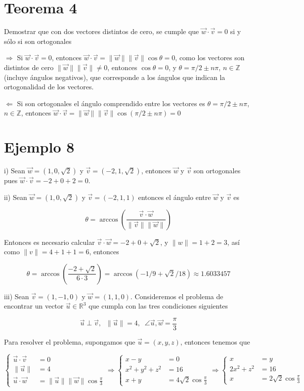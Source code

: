 \documentclass{article}
\begin{document}
\section*{Teorema 4}
Demostrar que con dos vectores distintos de cero, se cumple que $\vec{w} \cdot \vec{v} = 0$ si y sólo si son ortogonales

$\Rightarrow$ Si $\vec{w} \cdot \vec{v} = 0$, entonces $\vec{w} \cdot \vec{v} = \| \vec{w} \| \| \vec{v} \| \cos{\theta} = 0$, como los vectores son distintos de cero $\| \vec{w} \| \| \vec{v} \| \neq 0$, entonces $\cos{\theta}=0$, y $\theta=\pi/2 \pm n\pi$, $n\in\mathbb{Z}$ (incluye ángulos negativos), que corresponde a los ángulos que indican la ortogonalidad de los vectores.

$\Leftarrow$ Si son ortogonales el ángulo comprendido entre los vectores es $\theta=\pi/2\pm n\pi$, $n\in\mathbb{Z}$, entonces $\vec{w} \cdot \vec{v} = \| \vec{w} \| \| \vec{v} \| \cos{(\pi/2\pm n\pi)} =0 $

\section*{Ejemplo 8}
\noindent i) Sean $\vec{w} = (1,0,\sqrt{2})$ y $\vec{v} = (-2,1,\sqrt{2})$, entonces $\vec{w}$ y $\vec{v}$ son ortogonales pues $\vec{w}\cdot \vec{v}= -2+0+2=0$.

ii) Sean $\vec{w} = (1,0,\sqrt{2})$ y $\vec{v} = (-2,1,1)$ entonces el ángulo entre $\vec{w}$ y  $\vec{v}$ es 

$$
\theta = \arccos{\left(\frac{\vec{v}\cdot\vec{w}}{\| \vec{v} \| \| \vec{w} \|} \right)}
$$

Entonces es necesario calcular $\vec{v}\cdot\vec{w} = -2 +0 + \sqrt{2}$, y $\|w\|=1+2 = 3$, así como $\|v\|=4+1+1 = 6$, entonces

$$
\theta = \arccos{\left(\frac{-2 + \sqrt{2}}{6 \cdot 3} \right)} = \arccos{(-1/9+\sqrt{2}/18)} \approx 1.6033457
$$

iii) Sean $\vec{v} = (1,-1,0)$ y $\vec{w} = (1,1,0)$. Consideremos el problema de encontrar un vector $\vec{u} \in \mathbb{R}^3$ que cumpla con las tres condiciones siguientes

$$ 
\vec{u} \perp \vec{v}, \; \; \|\vec{u}\|=4, \; \; \angle\vec{u},\vec{w} = \frac{\pi}{3}
$$

Para resolver el problema, supongamos que $\vec{u} = (x,y,z)$, entonces tenemos que

$$
\begin{cases}
\vec{u} \cdot \vec{v} &= 0 \\
\|\vec{u}\| &= 4 \\
\vec{u} \cdot \vec{w} &= \| \vec{u} \| \| \vec{w} \| \cos{\frac{\pi}{3}}
\end{cases}
\Longrightarrow 
\begin{cases}
x-y &= 0 \\
x^2+y^2+z^2 &= 16 \\
x+y &= 4 \sqrt{2} \cos{\frac{\pi}{3}}
\end{cases}
\Longrightarrow 
\begin{cases}
x&= y \\
2x^2+z^2 &= 16 \\
x &= 2 \sqrt{2} \cos{\frac{\pi}{3}}
\end{cases}
$$
\end{document}
